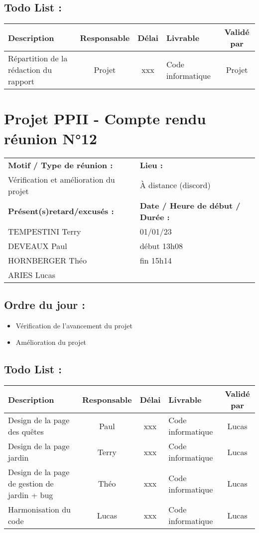 \documentclass[12pt,titlepage]{report}
\begin{document}
\subsection*{Todo List :}
\begin{tabular}{|p{3.5cm}|c|c|p{4.5cm}|c|}
    \hline 
    Description & Responsable & Délai & Livrable & Validé par 
    \\ \hline
    Répartition de la rédaction du rapport & Projet & xxx & Code informatique& Projet \\ \hline
\end{tabular}
\newpage

\section*{Projet PPII - Compte rendu réunion N°12}
\begin{tabular}{|p{7cm}|p{6cm}|}
    \hline
    \textbf{Motif / Type de réunion :}
    & \textbf{Lieu :}
    \\
    Vérification et amélioration du projet
    & 
    À distance (discord)
    \\ \hline
    \textbf{Présent(s)retard/excusés :}
    &
    \textbf{Date / Heure de début / Durée :}
    \\ 
    TEMPESTINI Terry &  01/01/23\\  
    DEVEAUX Paul & début 13h08\\
    HORNBERGER Théo & fin 15h14\\
    ARIES Lucas & 
    \\ \hline
\end{tabular}

\subsection*{Ordre du jour :}
\begin{itemize}
    \item{Vérification de l'avancement du projet}
    \item{Amélioration du projet}
\end{itemize}

\subsection*{Todo List :}
\begin{tabular}{|p{3.5cm}|c|c|p{4.5cm}|c|}
    \hline 
    Description & Responsable & Délai & Livrable & Validé par 
    \\ \hline
    Design de la page des quêtes & Paul & xxx & Code informatique & Lucas \\ \hline
    Design de la page jardin & Terry & xxx & Code informatique & Lucas \\ \hline
    Design de la page de gestion de jardin + bug & Théo & xxx & Code informatique & Lucas \\ \hline
    Harmonisation du code & Lucas & xxx & Code informatique & Lucas \\ \hline
\end{tabular}
\newpage
\end{document}
